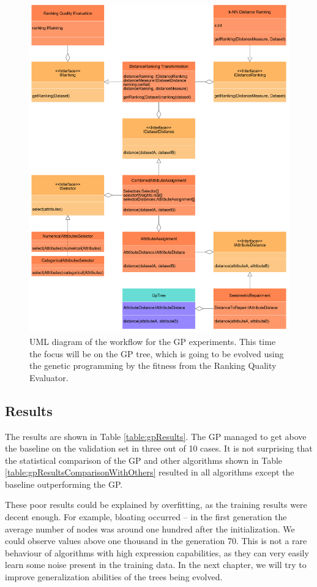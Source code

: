  \begin{figure}
 	\includegraphics[width=15cm]{Images/BigPictureGp.png}
 	\centering
 	\caption{UML diagram of the workflow for the GP experiments. This time the focus will be on the GP tree, which is going to be evolved using the genetic programming by the fitness from the Ranking Quality Evaluator.}
 	\label{fig:BigPictureGp}	
 \end{figure}
 
 \subsection{Results}
 The results are shown in Table \ref{table:gpResults}. The GP managed to get above the baseline on the validation set in three out of 10 cases. It is not surprising that the statistical comparison of the GP and other algorithms shown in Table \ref{table:gpResultsComparisonWithOthers} resulted in all algorithms except the baseline outperforming the GP.
 
 These poor results could be explained by overfitting, as the training results were decent enough. For example, bloating occurred -- in the first generation the average number of nodes was around one hundred after the initialization. We could observe values above one thousand in the generation 70. This is not a rare behaviour of algorithms with high expression capabilities, as they can very easily learn some noise present in the training data. In the next chapter, we will try to improve generalization abilities of the trees being evolved.
 
